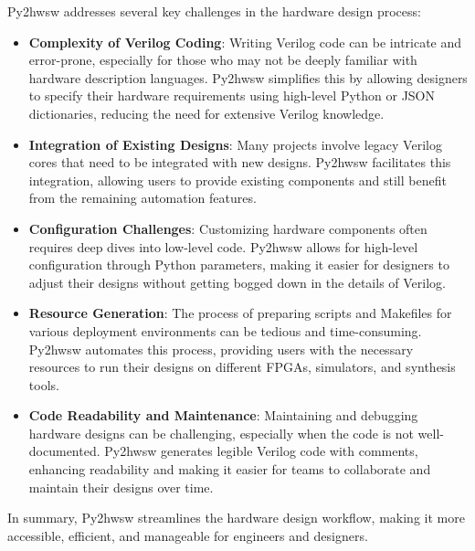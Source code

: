 %

Py2hwsw addresses several key challenges in the hardware design process:
\begin{itemize}
    \item \textbf{Complexity of Verilog Coding}: Writing Verilog code can be intricate and error-prone, especially for those who may not be deeply familiar with hardware description languages. Py2hwsw simplifies this by allowing designers to specify their hardware requirements using high-level Python or JSON dictionaries, reducing the need for extensive Verilog knowledge.

    \item \textbf{Integration of Existing Designs}: Many projects involve legacy Verilog cores that need to be integrated with new designs. Py2hwsw facilitates this integration, allowing users to provide existing components and still benefit from the remaining automation features.

    \item \textbf{Configuration Challenges}: Customizing hardware components often requires deep dives into low-level code. Py2hwsw allows for high-level configuration through Python parameters, making it easier for designers to adjust their designs without getting bogged down in the details of Verilog.

    \item \textbf{Resource Generation}: The process of preparing scripts and Makefiles for various deployment environments can be tedious and time-consuming. Py2hwsw automates this process, providing users with the necessary resources to run their designs on different FPGAs, simulators, and synthesis tools.

    \item \textbf{Code Readability and Maintenance}: Maintaining and debugging hardware designs can be challenging, especially when the code is not well-documented. Py2hwsw generates legible Verilog code with comments, enhancing readability and making it easier for teams to collaborate and maintain their designs over time.
\end{itemize}

In summary, Py2hwsw streamlines the hardware design workflow, making it more accessible, efficient, and manageable for engineers and designers.
